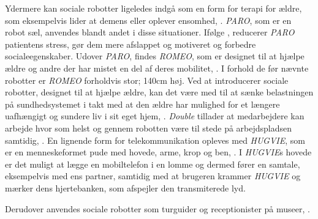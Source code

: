 Ydermere kan sociale robotter ligeledes indgå som en form for terapi for ældre, som eksempelvis lider at demens eller oplever ensomhed, \parencite[s. 110]{PDF:TheMobilePhoneAnEmontionalisedSR}. \textit{PARO}, som er en robot sæl, anvendes blandt andet i disse situationer. Ifølge \textcite{WEB:PARO}, reducerer \textit{PARO} patientens stress, gør dem mere afslappet og motiveret og forbedre socialeegenskaber. Udover \textit{PARO}, findes \textit{ROMEO}, som er designet til at hjælpe ældre og andre der har mistet en del af deres mobilitet, \parencite{WEB:ROMEO}. I forhold de før nævnte robotter er \textit{ROMEO} forholdvis stor; 140cm høj. Ved at introducerer sociale robotter, designet til at hjælpe ældre, kan det være med til at sænke belastningen på sundhedsystemet i takt med at den ældre har mulighed for et længere uafhængigt og sundere liv i sit eget hjem, \parencite[s. 1]{PDF:SharingALifeHarvey}.\blankline
%
\textit{Double} tillader at medarbejdere kan arbejde hvor som helst og gennem robotten være til stede på arbejdspladsen samtidig, \parencite{WEB:Double}. En lignende form for telekommunikation opleves med \textit{HUGVIE}, som er en menneskeformet pude med hovede, arme, krop og ben, \parencite[s. 78]{PDF:MinimizingTheHuman}. I \textit{HUGVIE}s hovede er det muligt at lægge en mobiltelefon i en lomme og dermed fører en samtale, eksempelvis med ens partner, samtidig med at brugeren krammer \textit{HUGVIE} og mærker dens hjertebanken, som afspejler den transmiterede lyd.

Derudover anvendes sociale robotter som turguider og receptionister på museer, \parencite[s. 22]{PDF:CloseButNotStuck}.